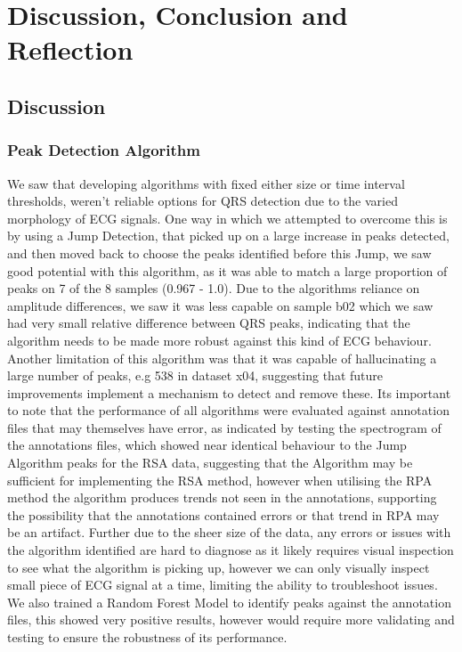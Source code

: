 \chapter{Discussion, Conclusion and Reflection}\label{ch:conclusion}

\section{Discussion}
\subsection{Peak Detection Algorithm}
We saw that developing algorithms with fixed either size or time interval thresholds, weren't reliable options 
for QRS detection due to the varied morphology of ECG signals. One way in which we attempted to overcome this is by using a Jump Detection, 
that picked up on a large increase in peaks detected, and then moved back to choose the peaks identified before this Jump, we saw good potential with this 
algorithm, as it was able to match a large proportion of peaks on 7 of the 8 samples (0.967 - 1.0). Due to the algorithms reliance 
on amplitude differences, we saw it was less capable on sample b02 which 
we saw had very small relative difference between QRS peaks, 
indicating that the algorithm needs to be made more robust against this kind of ECG behaviour. Another limitation
of this algorithm was that it was capable of hallucinating a large number of peaks, e.g 538 in dataset x04, suggesting that future improvements 
implement a mechanism to detect and remove these. Its important to note that the performance of all algorithms were evaluated against 
annotation files that may themselves have error, as indicated by testing the spectrogram of the annotations files,
which showed near identical behaviour to the Jump Algorithm peaks for the RSA data, suggesting 
that the Algorithm may be sufficient for implementing the RSA method, however when utilising the RPA method 
the algorithm produces trends not seen in the annotations, supporting the possibility 
that the annotations contained errors or that trend in RPA may be an artifact. Further due to the sheer size of the data, any errors or issues 
with the algorithm identified are hard to diagnose as it likely requires visual inspection to see what the algorithm 
is picking up, however we can only visually inspect small piece of ECG signal at a time, limiting the ability to 
troubleshoot issues. We also trained a Random Forest Model to identify peaks against the annotation files, this showed very positive results, 
however would require more validating and testing to ensure the robustness of its performance. 

